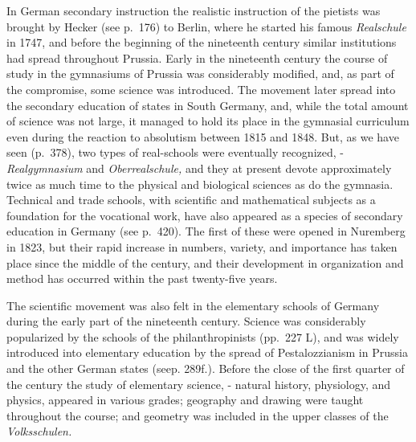 \documentclass[]{book}
\begin{document}
In German secondary instruction the realistic instruction of the pietists was brought by Hecker (see p.~176) to Berlin, where he started his famous \emph{Realschule} in 1747, and before the beginning of the nineteenth century similar institutions had spread throughout Prussia. Early in the nineteenth century the course of study in the gymnasiums of Prussia was considerably modified, and, as part of the compromise, some science was introduced. The movement later spread into the secondary education of states in South Germany, and, while the total amount of science was not large, it managed to hold its place in the gymnasial curriculum even during the reaction to absolutism between 1815 and 1848. But, as we have seen (p.~378), two types of real-schools were eventually recognized, - \emph{Realgymnasium} and \emph{Oberrealschule,} and they at present devote approximately twice as much time to the physical and biological sciences as do the gymnasia. Technical and trade schools, with scientific and mathematical subjects as a foundation for the vocational work, have also appeared as a species of secondary education in Germany (see p.~420). The first of these were opened in Nuremberg in 1823, but their rapid increase in numbers, variety, and importance has taken place since the middle of the century, and their development in organization and method has occurred within the past twenty-five years.

The scientific movement was also felt in the elementary schools of Germany during the early part of the nineteenth century. Science was considerably popularized by the schools of the philanthropinists (pp.~227 L), and was widely introduced into elementary education by the spread of Pestalozzianism in Prussia and the other German states (seep. 289f.). Before the close of the first quarter of the century the study of elementary science, - natural history, physiology, and physics, appeared in various grades; geography and drawing were taught throughout the course; and geometry was included in the upper classes of the \emph{Volksschulen.}
\end{document}
